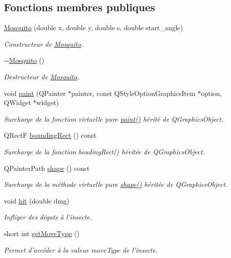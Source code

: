 \subsection*{Fonctions membres publiques}
\begin{DoxyCompactItemize}
\item 
\hyperlink{classMosquito_ad7755ed5b7cd5ed184c5cfb2d4f0785d}{Mosquito} (double x, double y, double s, double start\_\-angle)
\begin{DoxyCompactList}\small\item\em Constructeur de \hyperlink{classMosquito}{Mosquito}. \end{DoxyCompactList}\item 
\hyperlink{classMosquito_aec4169f2175c544c8d6e119164b469cd}{$\sim$Mosquito} ()
\begin{DoxyCompactList}\small\item\em Destructeur de \hyperlink{classMosquito}{Mosquito}. \end{DoxyCompactList}\item 
void \hyperlink{classMosquito_a306ab9aefce1f42ae5d46746a018c845}{paint} (QPainter $\ast$painter, const QStyleOptionGraphicsItem $\ast$option, QWidget $\ast$widget)
\begin{DoxyCompactList}\small\item\em Surcharge de la fonction virtuelle pure \hyperlink{classMosquito_a306ab9aefce1f42ae5d46746a018c845}{paint()} hérité de QGraphicsObject. \end{DoxyCompactList}\item 
QRectF \hyperlink{classBug_a9b39c25361faad07b1bf2dd927d09dab}{boundingRect} () const 
\begin{DoxyCompactList}\small\item\em Surcharge de la fonction boudingRect() héritée de QGraphicsObject. \end{DoxyCompactList}\item 
QPainterPath \hyperlink{classBug_a587a36d3145c2b4dba6c689af22c65ac}{shape} () const 
\begin{DoxyCompactList}\small\item\em Surcharge de la méthode virtuelle pure \hyperlink{classBug_a587a36d3145c2b4dba6c689af22c65ac}{shape()} héritée de QGraphicsObject. \end{DoxyCompactList}\item 
void \hyperlink{classBug_a63402c05b5ba3fb034e41f1ced0e4b9f}{hit} (double dmg)
\begin{DoxyCompactList}\small\item\em Infliger des dégats à l'insecte. \end{DoxyCompactList}\item 
short int \hyperlink{classBug_aced471cedcfa855baddf4c827003e755}{getMoveType} ()
\begin{DoxyCompactList}\small\item\em Permet d'accéder à la valeur moveType de l'insecte. \end{DoxyCompactList}\end{DoxyCompactItemize}
